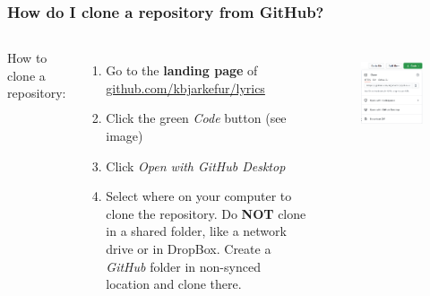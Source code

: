 \documentclass[aspectratio=169]{beamer} %
\newcommand{\trainingURL}[1]{{\color{blue}\url{#1}}}
\newcommand{\traininerUsername}{kbjarkefur}
\newcommand{\repoName}{\traininerUsername/lyrics}
\newcommand{\trainingRepoURL}[1]{\trainingURL{github.com/\repoName #1}}
\begin{document}
\begin{frame}
\frametitle{How do I clone a repository from GitHub?}

	\begin{columns}[c]

		How to clone a repository:
		\begin{enumerate}
			\item Go to the \textbf{landing page} of \trainingRepoURL{}
			\item Click the green \textit{Code} button (see image)
			\item Click \textit{Open with GitHub Desktop}
			\item Select where on your computer to clone the repository. Do \textbf{NOT} clone in a shared folder, like a network drive or in DropBox. Create a \textit{GitHub} folder in non-synced location and clone there.
		\end{enumerate}

		\begin{figure}
			\centering
			\includegraphics[width=1\linewidth]{img/clonedownload_button}
			\label{fig:clonedownloadbutton}
		\end{figure}

	\end{columns}

\end{frame}
\end{document}
